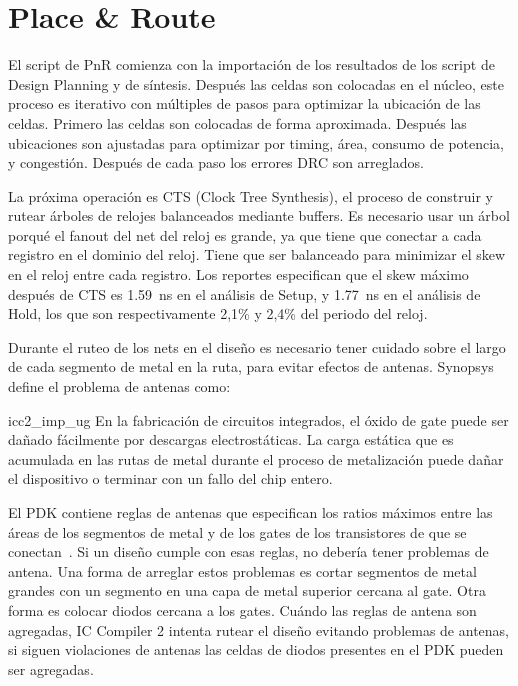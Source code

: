 \documentclass[a4paper, twoside, 11pt]{report}
\begin{document}
\FloatBarrier
\section{Place \& Route}

El script de PnR comienza con la importación de los resultados de los script de Design Planning y de síntesis. Después las celdas son colocadas en el núcleo, este proceso es iterativo con múltiples de pasos para optimizar la ubicación de las celdas. Primero las celdas son colocadas de forma aproximada. Después las ubicaciones son ajustadas para optimizar por timing, área, consumo de potencia, y congestión. Después de cada paso los errores DRC son arreglados.

La próxima operación es CTS (Clock Tree Synthesis), el proceso de construir y rutear árboles de relojes balanceados mediante buffers. Es necesario usar un árbol porqué el fanout del net del reloj es grande, ya que tiene que conectar a cada registro en el dominio del reloj. Tiene que ser balanceado para minimizar el skew en el reloj entre cada registro. Los reportes especifican que el skew máximo después de CTS es \SI{1.59}{\nano\second} en el análisis de Setup, y \SI{1.77}{\nano\second} en el análisis de Hold, los que son respectivamente 2,1\% y 2,4\% del periodo del reloj.

Durante el ruteo de los nets en el diseño es necesario tener cuidado sobre el largo de cada segmento de metal en la ruta, para evitar efectos de antenas. Synopsys define el problema de antenas como:

\begin{displaycquote}[traducido de][]{icc2_imp_ug}
  En la fabricación de circuitos integrados, el óxido de gate puede ser dañado fácilmente por descargas electrostáticas. La carga estática que es acumulada en las rutas de metal durante el proceso de metalización puede dañar el dispositivo o terminar con un fallo del chip entero.
\end{displaycquote}

El PDK contiene reglas de antenas que especifican los ratios máximos entre las áreas de los segmentos de metal y de los gates de los transistores de que se conectan~\cite{xh018_design_rules}. Si un diseño cumple con esas reglas, no debería tener problemas de antena. Una forma de arreglar estos problemas es cortar segmentos de metal grandes con un segmento en una capa de metal superior cercana al gate. Otra forma es colocar diodos cercana a los gates. Cuándo las reglas de antena son agregadas, IC Compiler 2 intenta rutear el diseño evitando problemas de antenas, si siguen violaciones de antenas las celdas de diodos presentes en el PDK pueden ser agregadas.
\end{document}
